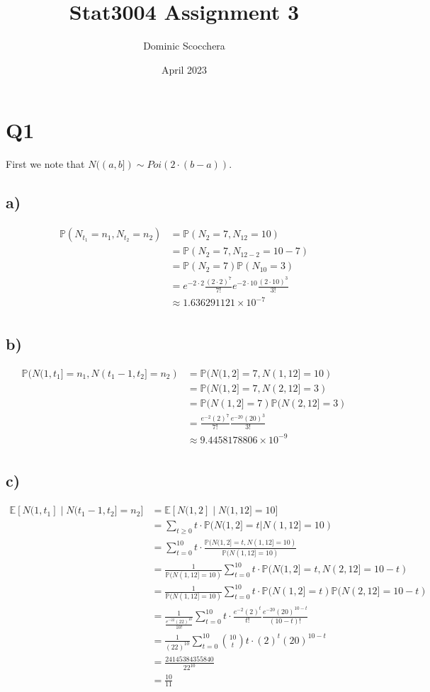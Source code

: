 \documentclass{article}
\title{Stat3004 Assignment 3}
\author{Dominic Scocchera}
\date{April 2023}
\begin{document}
\maketitle
\section*{Q1}
First we note that $N((a,b])\sim Poi(2\cdot(b-a))$.
\subsection*{a)}
\begin{align*}
\mathbb{P}(N_{t_1}=n_1,N_{t_2}=n_2)&=\mathbb{P}(N_{2}=7,N_{12}=10)\\
&=\mathbb{P}(N_2=7,N_{12-2}=10-7)\\
&=\mathbb{P}(N_2=7)\mathbb{P}(N_{10}=3)\\
&=e^{-2\cdot2}\frac{(2\cdot2)^7}{7!}e^{-2\cdot10}\frac{(2\cdot10)^{3}}{3!}\\
&\approx1.636291121\times10^{-7}\\
\end{align*}
\subsection*{b)}
\begin{align*}
\mathbb{P}(N(1, t_1]=n_1, N(t_1-1,t_2]=n_2)&=\mathbb{P}(N(1,2]=7, N(1,12]=10)\\
&=\mathbb{P}(N(1,2]=7, N(2,12]=3)\\
&=\mathbb{P}(N(1,2]=7)\mathbb{P}(N(2,12]=3)\\
&=\frac{e^{-2}(2)^7}{7!}\frac{e^{-20}(20)^3}{3!}\\
&\approx 9.4458178806\times10^{-9}\\
\end{align*}
\subsection*{c)}
\begin{align*}
\mathbb{E}[N(1,t_1]\;|\;N(t_1-1,t_2]=n_2]&=\mathbb{E}[N(1,2]\;|\;N(1,12]=10]\\
&=\sum_{t\geq0}t\cdot\mathbb{P}(N(1,2]=t|N(1,12]=10)\\
&=\sum_{t=0}^{10}t\cdot\frac{\mathbb{P}(N(1,2]=t,N(1,12]=10)}{\mathbb{P}(N(1,12]=10)}\\
&=\frac{1}{\mathbb{P}(N(1,12]=10)}\sum_{t=0}^{10}t\cdot\mathbb{P}(N(1,2]=t,N(2,12]=10-t)\\
&=\frac{1}{\mathbb{P}(N(1,12]=10)}\sum_{t=0}^{10}t\cdot\mathbb{P}(N(1,2]=t)\mathbb{P}(N(2,12]=10-t)\\
&=\frac{1}{\frac{e^{-22}(22)^{10}}{10!}}\sum_{t=0}^{10}t\cdot\frac{e^{-2}(2)^t}{t!}\frac{e^{-20}(20)^{10-t}}{(10-t)!}\\
&=\frac{1}{(22)^{10}}\sum_{t=0}^{10}{10 \choose t}t\cdot(2)^t(20)^{10-t}\\
&=\frac{24145384355840}{22^{10}}\\
&=\frac{10}{11}\\
\end{align*}
\end{document}
